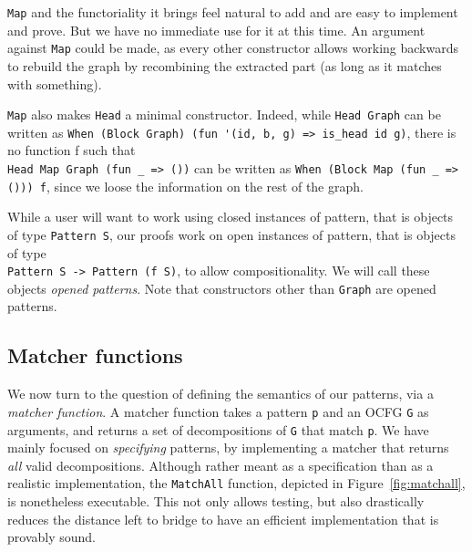 \documentclass[11pt]{article}
\newcommand{\inlinecoq}[1]{\mbox{\lstinline[style=customcoq,columns=fixed,basewidth=.48em]{#1}}}
\newcommand{\ilc}[1]{\inlinecoq{#1}}
\newcommand{\gr}[1]{\textcolor{Orange}{#1}}
\newcommand{\ocfg}{OCFG\xspace}
\begin{document}
\ilc{Map} and the functoriality it brings feel natural to add and are easy to implement and prove. But we have no immediate use for it at this time. An argument against \ilc{Map} could be made, as every other constructor allows working backwards to rebuild the graph by recombining the extracted part (as long as it matches with something).

\ilc{Map} also makes \ilc{Head} a minimal constructor. Indeed, while \ilc{Head Graph} can be written as \ilc{When (Block Graph) (fun '(id, b, g) => is_head id g)}, there is no function f such that\\\ilc{Head Map Graph (fun _ => ())} can be written as \ilc{When (Block Map (fun _ => ())) f}, since we loose the information on the rest of the graph.

While a user will want to work using closed instances of pattern, that is objects of type \ilc{Pattern S}, our proofs work on open instances of pattern, that is objects of type\\\ilc{Pattern S -> Pattern (f S)}, to allow compositionality. We will call these objects \emph{opened patterns}. Note that constructors other than \ilc{Graph} are opened patterns.

\subsection{Matcher functions}
\label{sec:matcher}

We now turn to the question of defining the semantics of our patterns, via a \emph{matcher function}. 
A matcher function takes a pattern \ilc{p} and an \ocfg{} \ilc{G} as arguments, and returns a set of decompositions of \ilc{G} that match \ilc{p}.
We have mainly focused on \emph{specifying} patterns, by implementing a matcher that returns \emph{all} valid decompositions. 
Although rather meant as a specification than as a realistic implementation, the \ilc{MatchAll} function, depicted in Figure~\ref{fig:matchall}, is nonetheless executable. This not only allows testing, but also drastically reduces the distance left to bridge to have an efficient implementation that is provably sound.

\end{document}
